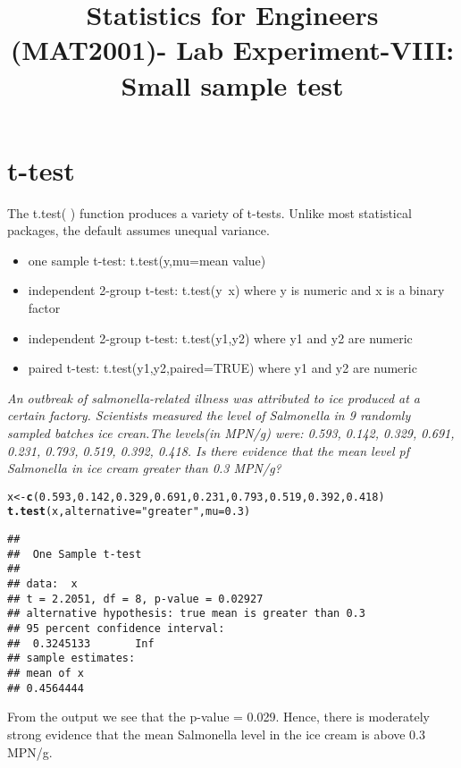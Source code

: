 \documentclass{article}\usepackage[]{graphicx}\usepackage[]{xcolor}
\date{}
\title{\textbf{Statistics for Engineers (MAT2001)- Lab  Experiment-VIII:  Small sample test}}
\makeatletter
\newcommand{\hlnum}[1]{\textcolor[rgb]{0.686,0.059,0.569}{#1}}%
\newcommand{\hlsng}[1]{\textcolor[rgb]{0.192,0.494,0.8}{#1}}%
\newcommand{\hldef}[1]{\textcolor[rgb]{0.345,0.345,0.345}{#1}}%
\newcommand{\hlkwb}[1]{\textcolor[rgb]{0.69,0.353,0.396}{#1}}%
\newcommand{\hlkwc}[1]{\textcolor[rgb]{0.333,0.667,0.333}{#1}}%
\newcommand{\hlkwd}[1]{\textcolor[rgb]{0.737,0.353,0.396}{\textbf{#1}}}%
\newenvironment{kframe}{%
 \def\at@end@of@kframe{}%
 \ifinner\ifhmode%
  \def\at@end@of@kframe{\end{minipage}}%
  \begin{minipage}{\columnwidth}%
 \fi\fi%
 \def\FrameCommand##1{\hskip\@totalleftmargin \hskip-\fboxsep
 \colorbox{shadecolor}{##1}\hskip-\fboxsep
     \hskip-\linewidth \hskip-\@totalleftmargin \hskip\columnwidth}%
 \MakeFramed {\advance\hsize-\width
   \@totalleftmargin\z@ \linewidth\hsize
   \@setminipage}}%
 {\par\unskip\endMakeFramed%
 \at@end@of@kframe}
\newenvironment{knitrout}{}{} %
\makeatother
\begin{document}
\maketitle
\section{t-test}
The t.test( ) function produces a variety of t-tests. Unlike most statistical packages, the
default assumes unequal variance.
\begin{itemize}
  \item  one sample t-test: t.test(y,mu=mean value)
  \item independent 2-group t-test: t.test(y~x) where y is numeric and x is a binary factor
  \item independent 2-group t-test: t.test(y1,y2)  where y1 and y2 are numeric
  \item paired t-test: t.test(y1,y2,paired=TRUE)  where y1 and y2 are numeric
\end{itemize}
\emph{An outbreak of salmonella-related illness was attributed to ice produced at a certain
factory. Scientists measured the level of Salmonella in 9 randomly sampled batches
ice crean.The levels(in MPN/g) were:
0.593, 0.142, 0.329, 0.691, 0.231, 0.793, 0.519, 0.392, 0.418. Is there evidence that the mean level pf Salmonella in ice cream greater than 0.3
MPN/g?}
\begin{knitrout}
\color{fgcolor}\begin{kframe}
\begin{alltt}
\hldef{x} \hlkwb{<-} \hlkwd{c}\hldef{(}\hlnum{0.593}\hldef{,}\hlnum{0.142}\hldef{,}\hlnum{0.329}\hldef{,}\hlnum{0.691}\hldef{,}\hlnum{0.231}\hldef{,}\hlnum{0.793}\hldef{,}\hlnum{0.519}\hldef{,}\hlnum{0.392}\hldef{,}\hlnum{0.418}\hldef{)}
\hlkwd{t.test}\hldef{(x,} \hlkwc{alternative} \hldef{=} \hlsng{"greater"}\hldef{,} \hlkwc{mu}\hldef{=}\hlnum{0.3}\hldef{)}
\end{alltt}
\begin{verbatim}
## 
## 	One Sample t-test
## 
## data:  x
## t = 2.2051, df = 8, p-value = 0.02927
## alternative hypothesis: true mean is greater than 0.3
## 95 percent confidence interval:
##  0.3245133       Inf
## sample estimates:
## mean of x 
## 0.4564444
\end{verbatim}
\end{kframe}
\end{knitrout}
From the output we see that the p-value = 0.029. Hence, there is moderately
strong evidence that the mean Salmonella level in the ice cream is above 0.3
MPN/g.
\end{document}
